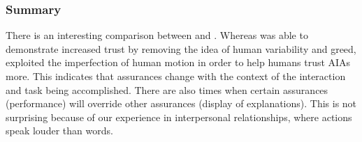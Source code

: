 \subsubsection{Summary}
There is an interesting comparison between \cite{Wu2016-ei} and \cite{Dragan2013-wd}. Whereas \cite{Wu2016-ei} was able to demonstrate increased trust by removing the idea of human variability and greed, \cite{Dragan2013-wd} exploited the imperfection of human motion in order to help humans trust AIAs more. This indicates that assurances change with the context of the interaction and task being accomplished. There are also times when certain assurances (performance) will override other assurances (display of explanations). This is not surprising because of our experience in interpersonal relationships, where actions speak louder than words.
